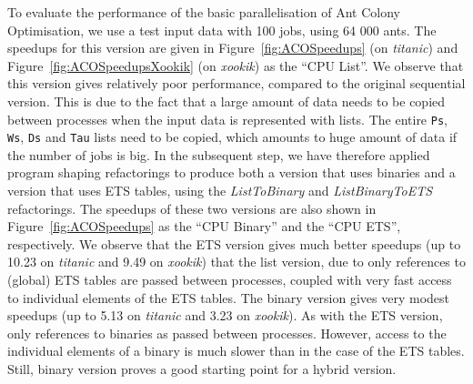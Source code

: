 \documentclass[final]{jfp1}
\begin{document}
To evaluate the performance of the basic parallelisation of Ant Colony
Optimisation, we use a test input data with 100 jobs, using 64 000 ants.
The speedups for this version are given in Figure~\ref{fig:ACOSpeedups}
(on \emph{titanic}) and Figure~\ref{fig:ACOSpeedupsXookik} (on \emph{xookik})
as the ``CPU List''. We observe that this version gives relatively poor
performance, compared to the original sequential version. This
is due to the fact that a large amount of data needs to be copied between
processes when the input data is represented with lists. The entire
\lstinline{Ps}, \lstinline{Ws}, \lstinline{Ds} and \lstinline{Tau} lists
need to be copied, which amounts to huge amount of data if the number of
jobs is big. In the subsequent step, we have therefore applied program
shaping refactorings to produce both a version that uses binaries and a
version that uses ETS tables, using the \emph{ListToBinary} and
\emph{ListBinaryToETS} refactorings. The speedups of these
two versions are also shown in Figure~\ref{fig:ACOSpeedups} as the
``CPU Binary'' and the ``CPU ETS'', respectively. We observe 
that the ETS version gives much better speedups (up to 10.23 on \emph{titanic}
and 9.49 on \emph{xookik}) that the list version, due to 
only references to (global) ETS tables are passed between processes, coupled
with very fast access to individual elements of the ETS tables.
The binary version gives very modest speedups (up to 5.13 on \emph{titanic}
and 3.23 on \emph{xookik}). As with the ETS version, only references to
binaries as passed between processes. However, access to the individual
elements of a binary is much slower than in the case of the ETS tables.
Still, binary version proves a good starting point for a hybrid version.
%
\end{document}
